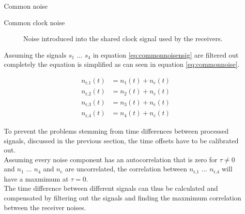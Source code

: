 \begin{subchapter}{Common noise}
\begin{description}
    \item[Common clock noise]
      Noise introduced into the shared clock signal used by the
      receivers.
  \end{description}

  Assuming the signals $s_\text{1}$ ... $s_\text{4}$ in equation
  \ref{eq:commonnoisensig} are filtered out completely the equation
  is simplified as can seen in equation \ref{eq:commonnoise}.

  \begin{align}
    \label{eq:commonnoise}
    n_\text{r,1}(t) &= n_\text{1}(t) + n_\text{c}(t) \\
    n_\text{r,2}(t) &= n_\text{2}(t) + n_\text{c}(t) \nonumber \\
    n_\text{r,3}(t) &= n_\text{3}(t) + n_\text{c}(t) \nonumber \\
    n_\text{r,4}(t) &= n_\text{4}(t) + n_\text{c}(t) \nonumber
  \end{align}

  To prevent the problems stemming from time differences between processed
  signals, discussed in the previous section, the time offsets have
  to be calibrated out. \\

  Assuming every noise component has an autocorrelation that is zero
  for $\tau \neq 0$ and $n_\text{1}$ ... $n_\text{4}$ and $n_\text{c}$
  are uncorrelated, the correlation between
  $n_\text{r,1}$ ... $n_\text{r,4}$ will have a maxmimum at $\tau = 0$. \\

  The time difference between different signals can thus be
  calculated and compensated by filtering out the signals and finding the
  maxmimum correlation between the receiver noises.
\end{subchapter}

